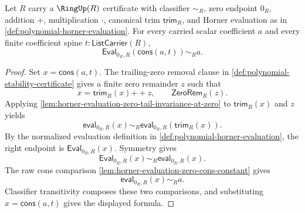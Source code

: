 \begin{theorem}
\label{thm:polynomial-evaluation-at-zero-constant-term}
Let $R$ carry a $\RingUp(R)$ certificate with classifier $\sim_R$, zero endpoint $0_R$, addition $+$, multiplication $\cdot$, canonical trim $\mathsf{trim}_R$, and Horner evaluation as in \autoref{def:polynomial-horner-evaluation}. For every carried scalar coefficient $a$ and every finite coefficient spine $t:\mathsf{ListCarrier}(R)$,
$$
\mathsf{Eval}_{0_R,R}(\mathsf{cons}(a,t))\sim_R a.
$$
\end{theorem}
\begin{proof}
Set $x=\mathsf{cons}(a,t)$. The trailing-zero removal clause in \autoref{def:polynomial-stability-certificate} gives a finite zero remainder $z$ such that
$$
x=\mathsf{trim}_R(x){++}z,
\qquad
\mathsf{ZeroRem}_R(z).
$$
Applying \autoref{lem:horner-evaluation-zero-tail-invariance-at-zero} to $\mathsf{trim}_R(x)$ and $z$ yields
$$
\mathsf{eval}_{0_R,R}(x)\sim_R\mathsf{eval}_{0_R,R}(\mathsf{trim}_R(x)).
$$
By the normalized evaluation definition in \autoref{def:polynomial-horner-evaluation}, the right endpoint is $\mathsf{Eval}_{0_R,R}(x)$. Symmetry gives
$$
\mathsf{Eval}_{0_R,R}(x)\sim_R\mathsf{eval}_{0_R,R}(x).
$$
The raw cons comparison \autoref{lem:horner-evaluation-zero-cons-constant} gives
$$
\mathsf{eval}_{0_R,R}(x)\sim_Ra.
$$
Classifier transitivity composes these two comparisons, and substituting $x=\mathsf{cons}(a,t)$ gives the displayed formula.
\end{proof}

